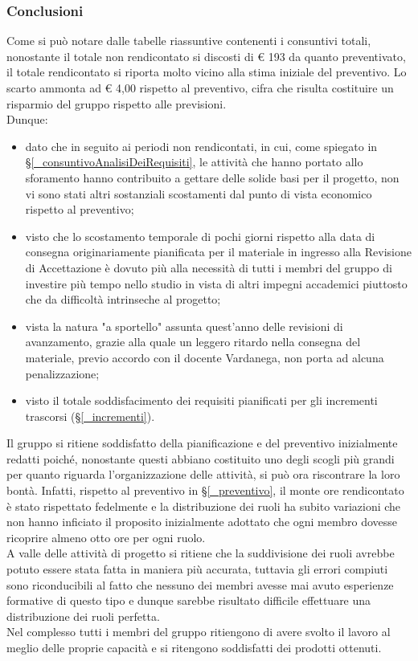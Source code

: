 \subsubsection{Conclusioni}
Come si può notare dalle tabelle riassuntive contenenti i consuntivi totali, nonostante il totale non rendicontato si discosti di € 193 da quanto preventivato, il totale rendicontato si riporta molto vicino alla stima iniziale del preventivo. Lo scarto ammonta ad € 4,00 rispetto al preventivo, cifra che risulta costituire un risparmio del gruppo rispetto alle previsioni. \\
Dunque:
\begin{itemize}
	\item dato che in seguito ai periodi non rendicontati, in cui, come spiegato in \S\ref{_consuntivoAnalisiDeiRequisiti}, le attività che hanno portato allo sforamento hanno contribuito a gettare delle solide basi per il progetto, non vi sono stati altri sostanziali scostamenti dal punto di vista economico rispetto al preventivo;
	\item visto che lo scostamento temporale di pochi giorni rispetto alla data di consegna originariamente pianificata per il materiale in ingresso alla Revisione di Accettazione è dovuto più alla necessità di tutti i membri del gruppo di investire più tempo nello studio in vista di altri impegni accademici piuttosto che da difficoltà intrinseche al progetto;
	\item vista la natura "a sportello" assunta quest'anno delle revisioni di avanzamento, grazie alla quale un leggero ritardo nella consegna del materiale, previo accordo con il docente Vardanega, non porta ad alcuna penalizzazione;  
	\item visto il totale soddisfacimento dei requisiti pianificati per gli incrementi trascorsi (\S\ref{_incrementi}).
\end{itemize}
  Il gruppo si ritiene soddisfatto della pianificazione e del preventivo inizialmente redatti poiché, nonostante questi abbiano costituito uno degli scogli più grandi per quanto riguarda l'organizzazione delle attività, si può ora riscontrare la loro bontà. Infatti, rispetto al preventivo in \S\ref{_preventivo}, il monte ore rendicontato è stato rispettato fedelmente e la distribuzione dei ruoli ha subito variazioni che non hanno inficiato il proposito inizialmente adottato che ogni membro dovesse ricoprire almeno otto ore per ogni ruolo. \\
  A valle delle attività di progetto si ritiene che la suddivisione dei ruoli avrebbe potuto essere stata fatta in maniera più accurata, tuttavia gli errori compiuti sono riconducibili al fatto che nessuno dei membri avesse mai avuto esperienze formative di questo tipo e dunque sarebbe risultato difficile effettuare una distribuzione dei ruoli perfetta.\\
  Nel complesso tutti i membri del gruppo ritiengono di avere svolto il lavoro al meglio delle proprie capacità e si ritengono soddisfatti dei prodotti ottenuti. \\ 

